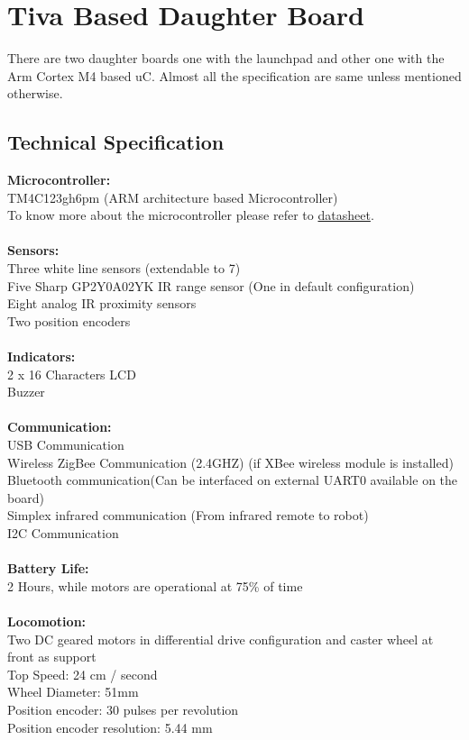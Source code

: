 \documentclass[a4paper,12pt,oneside]{article}
\begin{document}
{	\section{\textbf{Tiva Based Daughter Board}}
		{There are two daughter boards one with the launchpad and other one with the Arm Cortex M4 based uC. Almost all the specification are same unless mentioned otherwise.\\}
		\subsection{{ \textbf{Technical Specification}}\\}
			{\textbf{Microcontroller:\\}
			TM4C123gh6pm (ARM architecture based Microcontroller)\\ To know more about the microcontroller please refer to \href{www.ti.com/lit/gpn/tm4c123gh6pm}{datasheet}.\\ \\}
			{\textbf{Sensors:}\\
			Three white line sensors (extendable to 7)\\
			Five Sharp GP2Y0A02YK IR range sensor (One in default configuration)\\
			Eight analog IR proximity sensors\\
			Two position encoders\\\\} 
			\textbf{Indicators:\\}
			{2 x 16 Characters LCD\\
			Buzzer\\\\}
			\textbf{Communication:\\}
			{USB Communication\\
			Wireless ZigBee Communication (2.4GHZ) (if XBee wireless module is installed)\\
			Bluetooth communication(Can be interfaced on external UART0 available on the board)\\
			Simplex infrared communication (From infrared remote to robot)\\
			I2C Communication \\\\}
			\textbf{Battery Life:\\}
			{2 Hours, while motors are operational at 75\% of time\\\\}
			\textbf{Locomotion:\\}
			{Two DC geared motors in differential drive configuration and caster wheel at front as support\\
			Top Speed: 24 cm / second\\
			Wheel Diameter: 51mm\\
			Position encoder: 30 pulses per revolution\\
			Position encoder resolution: 5.44 mm\\\\}
}
\end{document}
